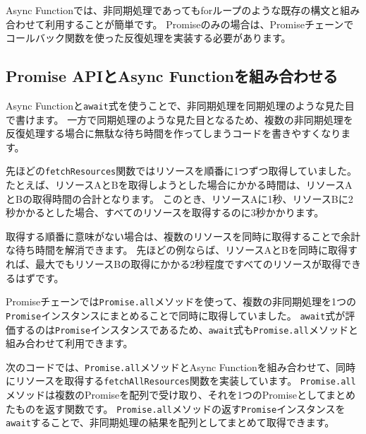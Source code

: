 Async
Functionでは、非同期処理であってもforループのような既存の構文と組み合わせて利用することが簡単です。
Promiseのみの場合は、Promiseチェーンでコールバック関数を使った反復処理を実装する必要があります。

\hypertarget{relationship-promise-async-function}{%
\subsection{Promise APIとAsync
Functionを組み合わせる}\label{relationship-promise-async-function}}

Async
Functionと\texttt{await}式を使うことで、非同期処理を同期処理のような見た目で書けます。
一方で同期処理のような見た目となるため、複数の非同期処理を反復処理する場合に無駄な待ち時間を作ってしまうコードを書きやすくなります。

先ほどの\texttt{fetchResources}関数ではリソースを順番に1つずつ取得していました。
たとえば、リソースAとBを取得しようとした場合にかかる時間は、リソースAとBの取得時間の合計となります。
このとき、リソースAに1秒、リソースBに2秒かかるとした場合、すべてのリソースを取得するのに3秒かかります。

取得する順番に意味がない場合は、複数のリソースを同時に取得することで余計な待ち時間を解消できます。
先ほどの例ならば、リソースAとBを同時に取得すれば、最大でもリソースBの取得にかかる2秒程度ですべてのリソースが取得できるはずです。

Promiseチェーンでは\texttt{Promise.all}メソッドを使って、複数の非同期処理を1つの\texttt{Promise}インスタンスにまとめることで同時に取得していました。
\texttt{await}式が評価するのは\texttt{Promise}インスタンスであるため、\texttt{await}式も\texttt{Promise.all}メソッドと組み合わせて利用できます。

次のコードでは、\texttt{Promise.all}メソッドとAsync
Functionを組み合わせて、同時にリソースを取得する\texttt{fetchAllResources}関数を実装しています。
\texttt{Promise.all}メソッドは複数のPromiseを配列で受け取り、それを1つのPromiseとしてまとめたものを返す関数です。
\texttt{Promise.all}メソッドの返す\texttt{Promise}インスタンスを\texttt{await}することで、非同期処理の結果を配列としてまとめて取得できます。

